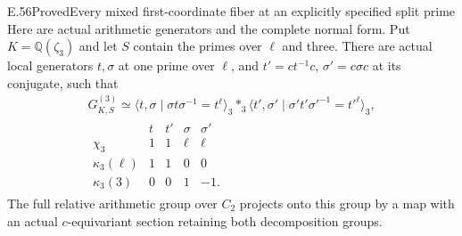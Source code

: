\begin{statement}{E.56}{Proved}{Every mixed first-coordinate fiber at an explicitly specified split prime}
Here are actual arithmetic generators and the complete
normal form. Put $K=\mathbb Q(\zeta_3)$ and let $S$
contain the primes over $\ell$ and three. There are
actual local generators $t,\sigma$ at one prime over
$\ell$, and $t'=ct^{-1}c$, $\sigma'=c\sigma c$ at its
conjugate, such that
\[
 \begin{gathered}
 G_{K,S}^{(3)}
   \simeq
   \langle t,\sigma\mid\sigma t\sigma^{-1}=t^\ell\rangle_3
       \mathop{\ast}_3
   \langle t',\sigma'\mid\sigma't'\sigma'^{-1}=t'^\ell\rangle_3,\\[2mm]
 \begin{array}{c|rrrr}
       &t&t'&\sigma&\sigma'\\\hline
 \chi_3&1&1&\ell&\ell\\
 \kappa_3(\ell)&1&1&0&0\\
 \kappa_3(3)&0&0&1&-1 .
 \end{array}
 \end{gathered}
 \tag{E56.6}
\]
The full relative arithmetic group over $C_2$
projects onto this group by a map with an actual
$c$-equivariant section retaining both decomposition
groups.


\end{statement}
